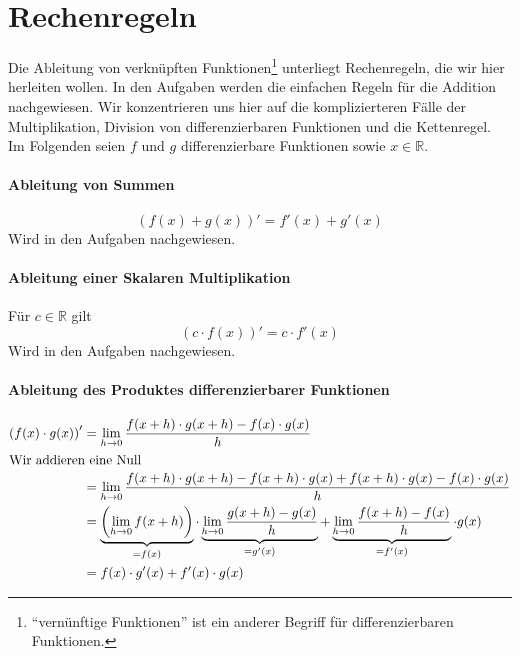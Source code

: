 \section{Rechenregeln}

Die Ableitung von verknüpften Funktionen\footnote{"`vernünftige Funktionen"' ist ein anderer Begriff für differenzierbaren Funktionen.} unterliegt Rechenregeln, die wir hier herleiten wollen. In den Aufgaben werden die einfachen Regeln für die Addition nachgewiesen. Wir konzentrieren uns hier auf die komplizierteren Fälle der Multiplikation, Division von differenzierbaren Funktionen und die Kettenregel. Im Folgenden seien $f$ und $g$ differenzierbare Funktionen sowie $x\in \mathbb{R}$.

\paragraph{Ableitung von Summen}
\begin{equation}\label{eq:diff0}
\left(f(x)+g(x) \right)' = f'(x)+ g'(x)
\end{equation}
Wird in den Aufgaben nachgewiesen.

\paragraph{Ableitung einer Skalaren Multiplikation}
Für $c\in \mathbb{R}$ gilt
\begin{equation}\label{eq:diff1}
\left(c\cdot f(x)\right)' = c \cdot f'(x)
\end{equation}
Wird in den Aufgaben nachgewiesen.

\paragraph{Ableitung des Produktes differenzierbarer Funktionen}
\begin{equation}
\begin{split}\label{eq:diff2}
\left(f(x) \cdot g(x) \right)' &= \lim\limits_{h\rightarrow 0} \frac{f(x+h)\cdot g(x+h)-f(x)\cdot g(x)}{h} \\
\intertext{Wir addieren eine Null}
&= \lim\limits_{h\rightarrow 0} \frac{f(x+h)\cdot g(x+h) -f(x+h)\cdot g(x)+f(x+h)\cdot g(x) - f(x)\cdot g(x)}{h} \\
&= \underbrace{\left( \lim\limits_{h\rightarrow 0}f(x+h)\right)}_{=f(x)} \cdot 
\underbrace{\lim\limits_{h\rightarrow 0} \frac{g(x+h)-g(x)}{h}}_{=g'(x)} +\underbrace{\lim\limits_{h\rightarrow 0} \frac{f(x+h)-f(x)}{h}}_{=f'(x)} \cdot g(x)\\
&= f(x)\cdot g'(x) + f'(x)\cdot g(x)
\end{split}
\end{equation}

